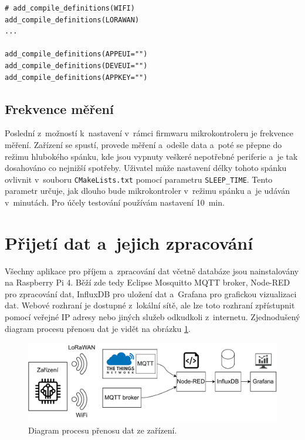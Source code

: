 \begin{lstlisting}[caption={Nastavení spojení pomocí LoRaWAN}]
# add_compile_definitions(WIFI)
add_compile_definitions(LORAWAN)
...

add_compile_definitions(APPEUI="")
add_compile_definitions(DEVEUI="")
add_compile_definitions(APPKEY="")
\end{lstlisting}

\subsection{Frekvence měření}

Poslední z~možností k~nastavení v~rámci firmwaru mikrokontroleru je frekvence měření. Zařízení se spustí, provede měření a~odešle data a~poté se přepne do režimu hlubokého spánku, kde jsou vypnuty veškeré nepotřebné periferie a~je tak dosahováno co nejnižší spotřeby. Uživatel může nastavení délky tohoto spánku ovlivnit v~souboru \texttt{CMakeLists.txt} pomocí parametru \texttt{SLEEP_TIME}. Tento parametr určuje, jak dlouho bude mikrokontroler v~režimu spánku a~je udáván v~minutách. Pro účely testování používám nastavení \SI{10}{\minute}.

\section{Přijetí dat a~jejich zpracování}

Všechny aplikace pro příjem a~zpracování dat včetně databáze jsou nainstalovány na Raspberry Pi 4. Běží zde tedy Eclipse Mosquitto MQTT broker, Node-RED pro zpracování dat, InfluxDB pro uložení dat a~Grafana pro grafickou vizualizaci dat. Webové rozhraní je dostupné z~lokální sítě, ale lze toto rozhraní zpřístupnit pomocí veřejné IP adresy nebo jiných služeb odkudkoli z~internetu. Zjednodušený diagram procesu přenosu dat je vidět na obrázku \ref{fig_dataFlow}.

\begin{figure}[h]
    \centering
    \includegraphics[width=\textwidth]{obrazky/data_flow.pdf}
    \caption{Diagram procesu přenosu dat ze zařízení.}
    \label{fig_dataFlow}
\end{figure}

